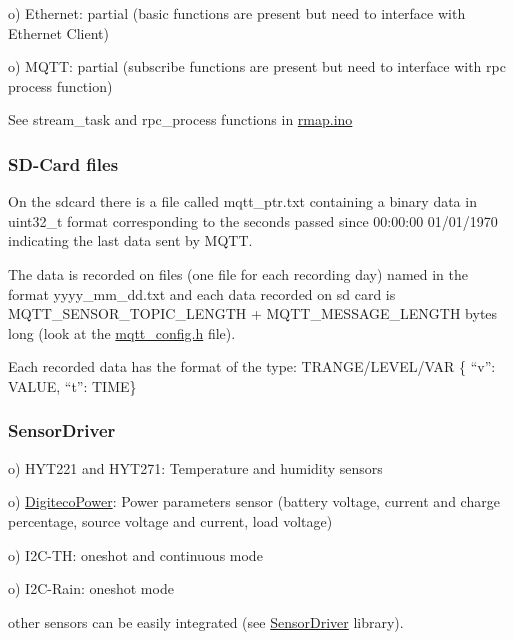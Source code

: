 o) Ethernet\+: partial (basic functions are present but need to interface with Ethernet Client)

o) M\+Q\+TT\+: partial (subscribe functions are present but need to interface with rpc process function)

See stream\+\_\+task and rpc\+\_\+process functions in \hyperlink{rmap_8ino}{rmap.\+ino}\hypertarget{index_files}{}\subsubsection{S\+D-\/\+Card files}\label{index_files}
On the sdcard there is a file called mqtt\+\_\+ptr.\+txt containing a binary data in uint32\+\_\+t format corresponding to the seconds passed since 00\+:00\+:00 01/01/1970 indicating the last data sent by M\+Q\+TT.

The data is recorded on files (one file for each recording day) named in the format yyyy\+\_\+mm\+\_\+dd.\+txt and each data recorded on sd card is M\+Q\+T\+T\+\_\+\+S\+E\+N\+S\+O\+R\+\_\+\+T\+O\+P\+I\+C\+\_\+\+L\+E\+N\+G\+TH + M\+Q\+T\+T\+\_\+\+M\+E\+S\+S\+A\+G\+E\+\_\+\+L\+E\+N\+G\+TH bytes long (look at the \hyperlink{mqtt__config_8h}{mqtt\+\_\+config.\+h} file).

Each recorded data has the format of the type\+: T\+R\+A\+N\+G\+E/\+L\+E\+V\+E\+L/\+V\+AR \{ “v”\+: V\+A\+L\+UE, “t”\+: T\+I\+ME\}\hypertarget{index_SensorDriver}{}\subsubsection{Sensor\+Driver}\label{index_SensorDriver}
o) H\+Y\+T221 and H\+Y\+T271\+: Temperature and humidity sensors

o) \hyperlink{namespaceDigitecoPower}{Digiteco\+Power}\+: Power parameters sensor (battery voltage, current and charge percentage, source voltage and current, load voltage)

o) I2\+C-\/\+TH\+: oneshot and continuous mode

o) I2\+C-\/\+Rain\+: oneshot mode

other sensors can be easily integrated (see \hyperlink{classSensorDriver}{Sensor\+Driver} library). 